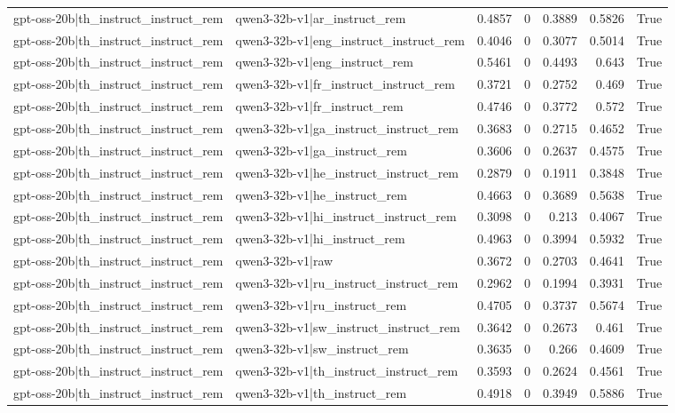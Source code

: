 \begin{table}
\begin{tabular}{l l r r r r l}
gpt-oss-20b|th_instruct_instruct_rem & qwen3-32b-v1|ar_instruct_rem & 0.4857 & 0 & 0.3889 & 0.5826 & True \\
gpt-oss-20b|th_instruct_instruct_rem & qwen3-32b-v1|eng_instruct_instruct_rem & 0.4046 & 0 & 0.3077 & 0.5014 & True \\
gpt-oss-20b|th_instruct_instruct_rem & qwen3-32b-v1|eng_instruct_rem & 0.5461 & 0 & 0.4493 & 0.643 & True \\
gpt-oss-20b|th_instruct_instruct_rem & qwen3-32b-v1|fr_instruct_instruct_rem & 0.3721 & 0 & 0.2752 & 0.469 & True \\
gpt-oss-20b|th_instruct_instruct_rem & qwen3-32b-v1|fr_instruct_rem & 0.4746 & 0 & 0.3772 & 0.572 & True \\
gpt-oss-20b|th_instruct_instruct_rem & qwen3-32b-v1|ga_instruct_instruct_rem & 0.3683 & 0 & 0.2715 & 0.4652 & True \\
gpt-oss-20b|th_instruct_instruct_rem & qwen3-32b-v1|ga_instruct_rem & 0.3606 & 0 & 0.2637 & 0.4575 & True \\
gpt-oss-20b|th_instruct_instruct_rem & qwen3-32b-v1|he_instruct_instruct_rem & 0.2879 & 0 & 0.1911 & 0.3848 & True \\
gpt-oss-20b|th_instruct_instruct_rem & qwen3-32b-v1|he_instruct_rem & 0.4663 & 0 & 0.3689 & 0.5638 & True \\
gpt-oss-20b|th_instruct_instruct_rem & qwen3-32b-v1|hi_instruct_instruct_rem & 0.3098 & 0 & 0.213 & 0.4067 & True \\
gpt-oss-20b|th_instruct_instruct_rem & qwen3-32b-v1|hi_instruct_rem & 0.4963 & 0 & 0.3994 & 0.5932 & True \\
gpt-oss-20b|th_instruct_instruct_rem & qwen3-32b-v1|raw & 0.3672 & 0 & 0.2703 & 0.4641 & True \\
gpt-oss-20b|th_instruct_instruct_rem & qwen3-32b-v1|ru_instruct_instruct_rem & 0.2962 & 0 & 0.1994 & 0.3931 & True \\
gpt-oss-20b|th_instruct_instruct_rem & qwen3-32b-v1|ru_instruct_rem & 0.4705 & 0 & 0.3737 & 0.5674 & True \\
gpt-oss-20b|th_instruct_instruct_rem & qwen3-32b-v1|sw_instruct_instruct_rem & 0.3642 & 0 & 0.2673 & 0.461 & True \\
gpt-oss-20b|th_instruct_instruct_rem & qwen3-32b-v1|sw_instruct_rem & 0.3635 & 0 & 0.266 & 0.4609 & True \\
gpt-oss-20b|th_instruct_instruct_rem & qwen3-32b-v1|th_instruct_instruct_rem & 0.3593 & 0 & 0.2624 & 0.4561 & True \\
gpt-oss-20b|th_instruct_instruct_rem & qwen3-32b-v1|th_instruct_rem & 0.4918 & 0 & 0.3949 & 0.5886 & True \\

\end{tabular}
\end{table}
